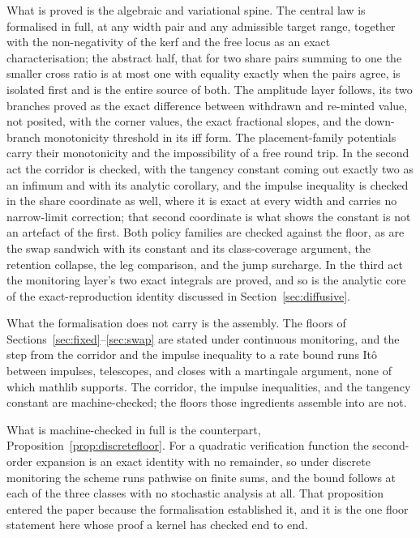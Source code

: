 \documentclass[11pt,a4paper]{article}
\theoremstyle{definition}
\theoremstyle{plain}
\theoremstyle{remark}
\begin{document}
What is proved is the algebraic and variational spine. The central law is formalised in full, at any width pair and any admissible target range, together with the non-negativity of 
the kerf and the free locus as an exact characterisation; the abstract half, that for two share pairs summing to one the smaller cross ratio is at most one with equality exactly 
when the pairs agree, is isolated first and is the entire source of both. The amplitude layer follows, its two branches proved as the exact difference between withdrawn and 
re-minted value, not posited, with the corner values, the exact fractional slopes, and the down-branch monotonicity threshold in its iff form. The placement-family potentials 
carry their monotonicity and the impossibility of a free round trip. In the second act the corridor is checked, with the tangency constant coming out exactly two as an infimum 
and with its analytic corollary, and the impulse inequality is checked in the share coordinate as well, where it is exact at every width and carries no narrow-limit correction; 
that second coordinate is what shows the constant is not an artefact of the first. Both policy families are checked against the floor, as are the swap sandwich with its constant 
and its class-coverage argument, the retention collapse, the leg comparison, and the jump surcharge. In the third act the monitoring layer's two exact integrals are proved, and 
so is the analytic core of the exact-reproduction identity discussed in Section~\ref{sec:diffusive}.

What the formalisation does not carry is the assembly. The floors of Sections~\ref{sec:fixed}--\ref{sec:swap} are stated under continuous monitoring, and the step from the corridor 
and the impulse inequality to a rate bound runs It\^o between impulses, telescopes, and closes with a martingale argument, none of which mathlib supports. The corridor, the impulse 
inequalities, and the tangency constant are machine-checked; the floors those ingredients assemble into are not.

What is machine-checked in full is the counterpart, Proposition~\ref{prop:discretefloor}. For a quadratic verification function the second-order expansion is an exact identity 
with no remainder, so under discrete monitoring the scheme runs pathwise on finite sums, and the bound follows at each of the three classes with no stochastic analysis at all. 
That proposition entered the paper because the formalisation established it, and it is the one floor statement here whose proof a kernel has checked end to end.
\end{document}
